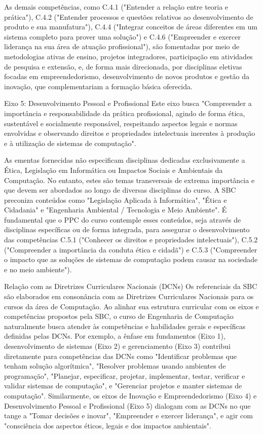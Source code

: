 As demais competências, como C.4.1 ("Entender a relação entre teoria e prática"), C.4.2 ("Entender processos e questões relativos ao desenvolvimento de produto e sua manufatura"), C.4.4 ("Integrar conceitos de áreas diferentes em um sistema completo para prover uma solução") e C.4.6 ("Empreender e exercer liderança na sua área de atuação profissional"), são fomentadas por meio de metodologias ativas de ensino, projetos integradores, participação em atividades de pesquisa e extensão, e, de forma mais direcionada, por disciplinas eletivas focadas em empreendedorismo, desenvolvimento de novos produtos e gestão da inovação, que complementariam a formação básica oferecida.

Eixo 5: Desenvolvimento Pessoal e Profissional
Este eixo busca "Compreender a importância e responsabilidade da prática profissional, agindo de forma ética, sustentável e socialmente responsável, respeitando aspectos legais e normas envolvidas e observando direitos e propriedades intelectuais inerentes à produção e à utilização de sistemas de computação".

As ementas fornecidas não especificam disciplinas dedicadas exclusivamente a Ética, Legislação em Informática ou Impactos Sociais e Ambientais da Computação. No entanto, estes são temas transversais de extrema importância e que devem ser abordados ao longo de diversas disciplinas do curso. A SBC preconiza conteúdos como "Legislação Aplicada à Informática", "Ética e Cidadania" e "Engenharia Ambiental / Tecnologia e Meio Ambiente". É fundamental que o PPC do curso contemple esses conteúdos, seja através de disciplinas específicas ou de forma integrada, para assegurar o desenvolvimento das competências C.5.1 ("Conhecer os direitos e propriedades intelectuais"), C.5.2 ("Compreender a importância da conduta ética e cidadã") e C.5.3 ("Compreender o impacto que as soluções de sistemas de computação podem causar na sociedade e no meio ambiente").

Relação com as Diretrizes Curriculares Nacionais (DCNs)
Os referenciais da SBC são elaborados em consonância com as Diretrizes Curriculares Nacionais para os cursos da área de Computação. Ao alinhar sua estrutura curricular com os eixos e competências propostos pela SBC, o curso de Engenharia de Computação naturalmente busca atender às competências e habilidades gerais e específicas definidas pelas DCNs. Por exemplo, a ênfase em fundamentos (Eixo 1), desenvolvimento de sistemas (Eixo 2) e gerenciamento (Eixo 3) contribui diretamente para competências das DCNs como "Identificar problemas que tenham solução algorítmica", "Resolver problemas usando ambientes de programação", "Planejar, especificar, projetar, implementar, testar, verificar e validar sistemas de computação", e "Gerenciar projetos e manter sistemas de computação". Similarmente, os eixos de Inovação e Empreendedorismo (Eixo 4) e Desenvolvimento Pessoal e Profissional (Eixo 5) dialogam com as DCNs no que tange a "Tomar decisões e inovar", "Empreender e exercer liderança", e agir com "consciência dos aspectos éticos, legais e dos impactos ambientais".